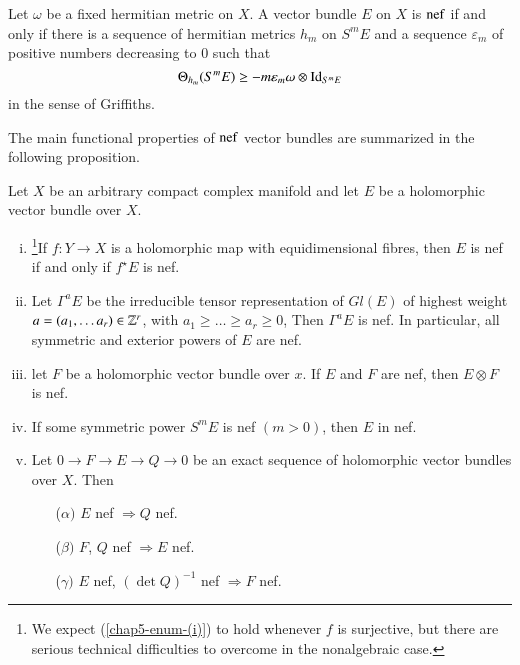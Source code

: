 \begin{criterion}\label{chap5-definition-1.5}
Let $\omega$ be a fixed hermitian metric on $X$. A vector bundle $E$ on $X$ is $\operatorname{nef}$ if and only if there is a sequence of hermitian metrics $h_{m}$ on $S^{m}E$ and a sequence $\varepsilon_{m}$ of positive numbers decreasing to 0 such that
$$
\Theta_{h_{m}}(S^{m} E) \geq -m\varepsilon_{m}\omega\otimes \operatorname{Id}_{S^{m} E}
$$
in the sense of Griffiths.

The main functional properties of $\operatorname{nef}$ vector bundles are summarized in the following proposition.
\end{criterion}

\begin{secprop}\label{chap5-prop-1.6}
Let $X$ be an arbitrary compact complex manifold and let $E$ be a  holomorphic vector bundle over $X$.
\begin{enumerate}[(i)]
\item \footnote{We expect (\ref{chap5-enum-(i)}) to hold whenever $f$ is surjective, but there are serious technical difficulties to overcome in the nonalgebraic case.}\pageoriginale If $f: Y\rightarrow X$ is a holomorphic map with equidimensional fibres, then $E$ is nef if and only if $f^{\star}E$ is nef.\label{chap5-enum-(i)}
\item Let $\Gamma^{a}E$ be the irreducible tensor representation of $Gl(E)$ of highest weight $a= (a_{1}, \ldots a_{r}) \in \mathbb{Z}^{r}$, with $a_{1}\geq\ldots\geq a_{r} \geq 0$, Then $\Gamma^{a}E$ is nef. In particular, all symmetric and exterior powers of $E$ are nef.\label{chap5-enum-(ii)}
\item let $F$ be a holomorphic vector bundle over $x$. If $E$ and $F$ are nef, then $E\otimes F$ is nef.\label{chap5-enum-(iii)}

\item If some symmetric power $S^{m}E$ is nef $(m > 0)$, then $E$ in nef. \label{chap5-enum-(iv)}

\item Let $0 \rightarrow F \rightarrow E \rightarrow Q \rightarrow 0$ be an exact sequence of holomorphic vector bundles over $X$. Then\label{chap5-enum-(v)}
    \begin{enumerate}
        \item[($\alpha)$] $E$ nef $\Rightarrow Q$ nef.
        \item [($\beta)$] $F$, $Q$ nef $\Rightarrow E$ nef.
        \item [($\gamma)$] $E$ nef, $(\det Q)^{-1}$ nef $\Rightarrow F$ nef.
    \end{enumerate}
\end{enumerate}
\end{secprop}

